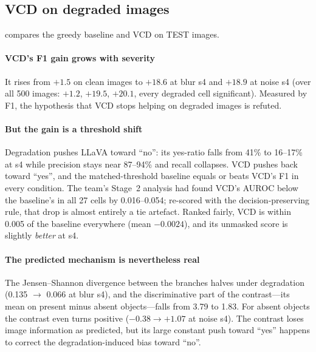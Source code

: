 \documentclass[10pt,a4paper]{article}
\begin{document}
\subsection{VCD on degraded images}\label{sec:stage2}
 compares the greedy baseline and VCD on TEST images.

\paragraph{VCD's F1 gain grows with severity} It rises from $+1.5$ on clean images to $+18.6$ at blur s4 and $+18.9$ at noise s4 (over all 500 images: $+1.2$, $+19.5$, $+20.1$, every degraded cell significant). Measured by F1, the hypothesis that VCD stops helping on degraded images is refuted.

\paragraph{But the gain is a threshold shift} Degradation pushes LLaVA toward ``no'': its yes-ratio falls from 41\% to 16--17\% at s4 while precision stays near 87--94\% and recall collapses. VCD pushes back toward ``yes'', and the matched-threshold baseline equals or beats VCD's F1 in every condition. The team's Stage~2 analysis had found VCD's AUROC below the baseline's in all 27 cells by 0.016--0.054; re-scored with the decision-preserving rule, that drop is almost entirely a tie artefact. Ranked fairly, VCD is within 0.005 of the baseline everywhere (mean $-0.0024$), and its unmasked score is slightly \emph{better} at s4.

\paragraph{The predicted mechanism is nevertheless real} The Jensen--Shannon divergence between the branches halves under degradation (0.135 $\to$ 0.066 at blur s4), and the discriminative part of the contrast---its mean on present minus absent objects---falls from 3.79 to 1.83. For absent objects the contrast even turns positive ($-0.38\to+1.07$ at noise s4). The contrast loses image information as predicted, but its large constant push toward ``yes'' happens to correct the degradation-induced bias toward ``no''.
\end{document}
